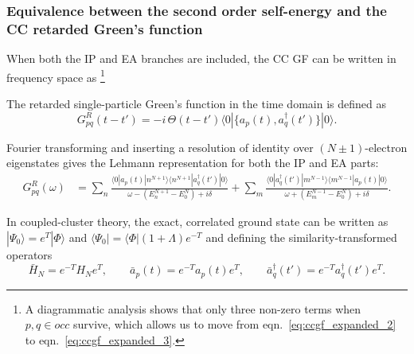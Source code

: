 \subsubsection{Equivalence between the second order self-energy and the CC retarded Green's function}
When both the IP and EA branches are included, the CC GF can be written in frequency space as
\footnote{A diagrammatic analysis shows that only three non-zero terms when $p, q \in o c c$ survive, which allows us to move from eqn.~\ref{eq:ccgf_expanded_2} to eqn.~\ref{eq:ccgf_expanded_3}.}
\begin{tcolorbox}
    The retarded single-particle Green's function in the time domain is defined as
\begin{equation}
    G_{pq}^R(t-t') = -i \, \Theta(t-t') 
    \langle 0 | \{ a_p(t), a_q^\dagger(t') \} |0\rangle .
\label{spgf}
\end{equation}

Fourier transforming and inserting a resolution of identity over $(N\!\pm\!1)$-electron eigenstates gives the Lehmann representation for both the IP and EA parts:
\begin{align}
    G_{pq}^R(\omega) 
    &= \sum_n \frac{ \langle 0 | a_p(t) | n^{N+1} \rangle \langle n^{N+1} | a_q^\dagger(t') |0\rangle }
      {\omega - (E_n^{N+1} - E_0^N) + i\delta} 
    + \sum_m \frac{ \langle 0 | a_q^\dagger(t') | m^{N-1} \rangle \langle m^{N-1} | a_p(t) |0\rangle }
      {\omega + (E_m^{N-1} - E_0^N) + i\delta}.
\end{align}

In coupled-cluster theory, the exact, correlated ground state can be written as $|\Psi_0\rangle = e^T |\Phi\rangle$ and $\langle \Psi_0| = \langle \Phi | (1+\Lambda) e^{-T}$ and defining the similarity-transformed operators
\begin{equation}
    \bar{H}_N = e^{-T} H_N e^{T}, \qquad
    \bar{a}_p(t) = e^{-T} a_p(t) e^{T}, \qquad
    \bar{a}_q^\dagger(t') = e^{-T} a_q^\dagger(t') e^{T}.
\end{equation}


\end{tcolorbox}
